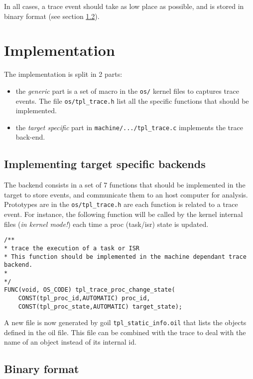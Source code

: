 In all cases, a trace event should take as low place as possible, and is stored in binary format (see section \ref{sec:traceBinFormat}).


\section{Implementation}
The implementation is split in 2 parts:
\begin{itemize}
	\item the \emph{generic} part is a set of macro in the \texttt{os/} kernel files to captures trace events. The file \texttt{os/tpl_trace.h} list all the specific functions that should be implemented.
	\item the \emph{target specific} part in \lstinline{machine/.../tpl_trace.c} implements the trace back-end. 
\end{itemize}

\subsection{Implementing target specific backends}
\label{sec:trace:targetbackend}

The backend consists in a set of 7 functions that should be implemented in the target to store events, and communicate them to an host computer for analysis. Prototypes are in the \texttt{os/tpl_trace.h} are each function is related to a trace event. For instance, the following function will be called by the kernel internal files (\emph{in kernel mode!}) each time a proc (task/isr) state is updated.

\begin{lstlisting}
/**
* trace the execution of a task or ISR
* This function should be implemented in the machine dependant trace backend.
*
*/
FUNC(void, OS_CODE) tpl_trace_proc_change_state(
    CONST(tpl_proc_id,AUTOMATIC) proc_id,
    CONST(tpl_proc_state,AUTOMATIC) target_state);
\end{lstlisting}

A new file is now generated by goil \texttt{tpl_static_info.oil} that lists the objects defined in the oil file. This file can be combined with the trace to deal with the name of an object instead of its internal id.


\subsection{Binary format}
\label{sec:traceBinFormat}

